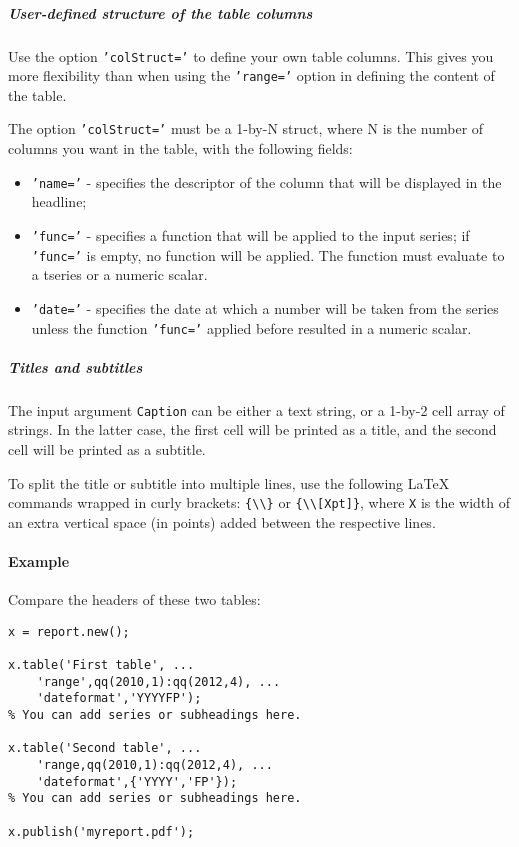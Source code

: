 \subparagraph{User-defined structure of the table
columns}\label{user-defined-structure-of-the-table-columns}

Use the option \texttt{'colStruct='} to define your own table columns.
This gives you more flexibility than when using the \texttt{'range='}
option in defining the content of the table.

The option \texttt{'colStruct='} must be a 1-by-N struct, where N is the
number of columns you want in the table, with the following fields:

\begin{itemize}
\item
  \texttt{'name='} - specifies the descriptor of the column that will be
  displayed in the headline;
\item
  \texttt{'func='} - specifies a function that will be applied to the
  input series; if \texttt{'func='} is empty, no function will be
  applied. The function must evaluate to a tseries or a numeric scalar.
\item
  \texttt{'date='} - specifies the date at which a number will be taken
  from the series unless the function \texttt{'func='} applied before
  resulted in a numeric scalar.
\end{itemize}

\subparagraph{Titles and subtitles}\label{titles-and-subtitles}

The input argument \texttt{Caption} can be either a text string, or a
1-by-2 cell array of strings. In the latter case, the first cell will be
printed as a title, and the second cell will be printed as a subtitle.

To split the title or subtitle into multiple lines, use the following
LaTeX commands wrapped in curly brackets:
\texttt{\{\textbackslash{}\textbackslash{}\}} or
\texttt{\{\textbackslash{}\textbackslash{}{[}Xpt{]}\}}, where \texttt{X}
is the width of an extra vertical space (in points) added between the
respective lines.

\paragraph{Example}\label{example}

Compare the headers of these two tables:

\begin{verbatim}
x = report.new();

x.table('First table', ...
    'range',qq(2010,1):qq(2012,4), ...
    'dateformat','YYYYFP');
% You can add series or subheadings here.

x.table('Second table', ...
    'range,qq(2010,1):qq(2012,4), ...
    'dateformat',{'YYYY','FP'});
% You can add series or subheadings here.

x.publish('myreport.pdf');
\end{verbatim}


